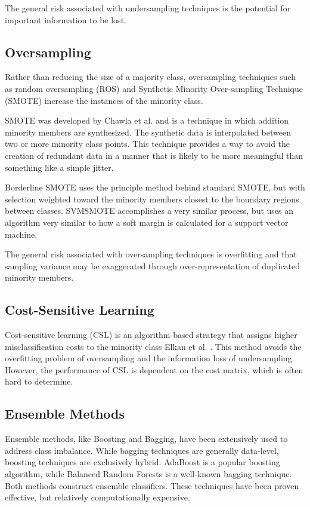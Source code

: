 \documentclass[journal]{IEEEtran}
\begin{document}
	The general risk associated with undersampling techniques is the potential for important information to be lost.

	\subsection{Oversampling}

	Rather than reducing the size of a majority class, oversampling techniques such as random oversampling (ROS) and Synthetic Minority Over-sampling Technique (SMOTE) increase the instances of the minority class. 

	SMOTE was developed by Chawla et al. \cite{chawla2002} and is a technique in which addition minority members are synthesized. The synthetic data is interpolated between two or more minority class points. This technique provides a way to avoid the creation of redundant data in a manner that is likely to be more meaningful than something like a simple jitter. 

	Borderline SMOTE \cite{han2005} uses the principle method behind standard SMOTE, but with selection weighted toward the minority members closest to the boundary regions between classes. SVMSMOTE \cite{nguyen2011} accomplishes a very similar process, but uses an algorithm very similar to how a soft margin is calculated for a support vector machine.

	The general risk associated with oversampling techniques is overfitting and that sampling variance may be exaggerated through over-representation of duplicated minority members.

	\subsection{Cost-Sensitive Learning}
	
	Cost-sensitive learning (CSL) is an algorithm based strategy that assigns higher misclassification costs to the minority class Elkan et al. \cite{elkan2001}. This method avoids the overfitting problem of oversampling and the information loss of undersampling. However, the performance of CSL is dependent on the cost matrix, which is often hard to determine.
	
	\subsection{Ensemble Methods} 
	
	Ensemble methods, like Boosting and Bagging, have been extensively used to address class imbalance. 
	While bagging techniques are generally data-level, boosting techniques are exclusively hybrid.
	AdaBoost \cite{freund1997} is a popular boosting algorithm, while Balanced Random Forests \cite{chen2004} is a well-known bagging technique. 
	Both methods construct ensemble classifiers. 
	These techniques have been proven effective, but relatively computationally expensive.
	
\end{document}
